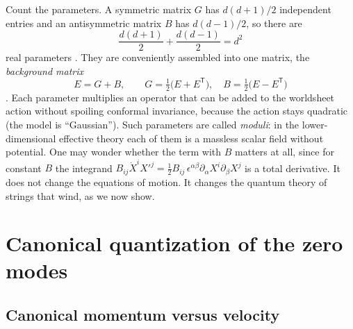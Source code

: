 Count the parameters. A symmetric matrix $G$ has $d(d+1)/2$ independent entries and an
antisymmetric matrix $B$ has $d(d-1)/2$, so there are
\begin{equation}\label{eq:narain:count}
 \frac{d(d+1)}2+\frac{d(d-1)}2=d^2
\end{equation}
real parameters . They are
conveniently assembled into one matrix, the \emph{background matrix}
\begin{equation}\label{eq:narain:E}
 E=G+B,\qquad G=\tfrac12\big(E+E^{\mathsf T}\big),\quad B=\tfrac12\big(E-E^{\mathsf T}\big)
\end{equation}
. Each parameter multiplies an operator that
can be added to the worldsheet action without spoiling conformal invariance, because the
action stays quadratic (the model is ``Gaussian''). Such parameters are called
\emph{moduli}: in the lower-dimensional effective theory each of them is a
massless scalar field without potential. One may wonder whether the term with $B$ matters at
all, since for constant $B$ the integrand $B_{ij}\dot X^iX'^j
=\tfrac12B_{ij}\,\epsilon^{\alpha\beta}\partial_\alpha X^i\partial_\beta X^j$ is a total
derivative. It does not change the equations of motion. It changes the quantum theory of
strings that wind, as we now show.

\section{Canonical quantization of the zero modes}\label{sec:narain:zeromodes}

\subsection{Canonical momentum versus velocity}

